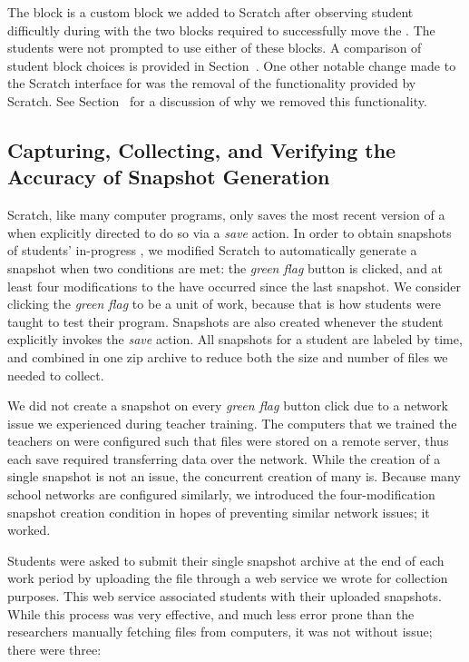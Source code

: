 The \glideto{} block is a custom block we added to Scratch after observing
student difficultly during \sone{} with the two blocks required to successfully
move the \net{}. The students were not prompted to use either of these
blocks. A comparison of student block choices is provided in
Section~. One other notable change made to the Scratch
interface for \stwo{} was the removal of the \dce{} functionality provided by
Scratch. See Section~ for a discussion of why we removed this
functionality.

\subsection{Capturing, Collecting, and Verifying the Accuracy of Snapshot Generation}

Scratch, like many computer programs, only saves the most recent version of a
\sprogram{} when explicitly directed to do so via a \emph{save} action. In
order to obtain snapshots of students' in-progress , we modified
Scratch to automatically generate a snapshot when two conditions are met: the
\emph{green flag} button is clicked, and at least four modifications to the
\sprogram{} have occurred since the last snapshot. We consider clicking the
\emph{green flag} to be a unit of work, because that is how students were
taught to test their program. Snapshots are also created whenever the student
explicitly invokes the \emph{save} action. All snapshots for a student are
labeled by time, and combined in one zip archive to reduce both the size and
number of files we needed to collect.

We did not create a snapshot on every \emph{green flag} button click due to a
network issue we experienced during teacher training. The computers that we
trained the teachers on were configured such that \sprogram{} files were stored
on a remote server, thus each save required transferring data over the
network. While the creation of a single snapshot is not an issue, the
concurrent creation of many is. Because many school networks are configured
similarly, we introduced the four-modification snapshot creation condition in
hopes of preventing similar network issues; it worked.

Students were asked to submit their single snapshot archive at the end of each
work period by uploading the file through a web service we wrote for collection
purposes. This web service associated students with their uploaded
snapshots. While this process was very effective, and much less error prone
than the researchers manually fetching files from computers, it was not without
issue; there were three:

